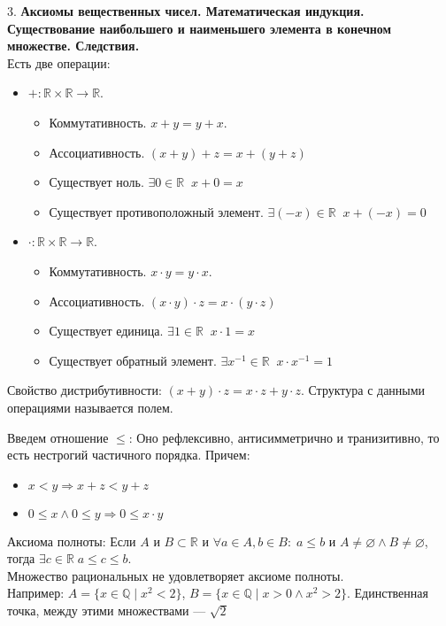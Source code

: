 \documentclass[12pt]{article}
\begin{document}
3. \textbf{Аксиомы вещественных чисел. Математическая индукция. Существование наибольшего и наименьшего элемента в конечном множестве. Следствия.}\\
Есть две операции:
\begin{itemize}
    \item $+: \mathbb{R} \times \mathbb{R} \to \mathbb{R}$.
        \begin{itemize}
            \item Коммутативность. $x+y=y+x$.
            \item Ассоциативность.  $(x+y)+z=x+(y+z)$
            \item Существует ноль.  $\exists 0 \in \mathbb{R} \; \; x + 0 = x$
            \item Существует противоположный элемент. $\exists (-x) \in \mathbb{R} \; \; x+(-x) = 0$
        \end{itemize}
    \item $\cdot: \mathbb{R} \times \mathbb{R} \to \mathbb{R}$.
        \begin{itemize}
            \item Коммутативность. $x\cdot y=y\cdot x$.
            \item Ассоциативность.  $(x\cdot y)\cdot z=x\cdot (y\cdot z)$
            \item Существует единица.  $\exists 1 \in \mathbb{R} \; \; x \cdot 1 = x$
            \item Существует обратный элемент. $\exists x^{-1} \in \mathbb{R} \; \; x \cdot x^{-1} = 1$
        \end{itemize}
\end{itemize}
Свойство дистрибутивности: $(x+y) \cdot z = x \cdot z + y \cdot z$. Структура с данными операциями называется полем.

Введем отношение $\le$: Оно рефлексивно, антисимметрично и транизитивно, то есть нестрогий частичного порядка. Причем:
\begin{itemize}
    \item $x< y \Rightarrow x+z < y+z$
    \item  $0 \le x \land 0 \le y \Rightarrow 0 \le x\cdot y$
\end{itemize}
Аксиома полноты: Если $A$ и $B \subset \mathbb{R}$ и $\forall a \in A, b \in B: \; a \le b$ и $A \neq \varnothing \land B \neq \varnothing$, тогда $\exists c \in \mathbb{R}\; a \le c \le b$.\\
Множество рациональных не удовлетворяет аксиоме полноты.\\
Например: $A = \{x \in \mathbb{Q} \; \vert \; x^2 < 2\}$,  $B = \{x \in \mathbb{Q} \; \vert \; x>0 \land x^2 > 2\}$. Единственная точка, между этими множествами --- $\sqrt{2}$ 
\end{document}
